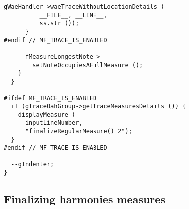 \begin{lstlisting}[language=CPlusPlus]
        gWaeHandler->waeTraceWithoutLocationDetails (
          __FILE__, __LINE__,
          ss.str ());
      }
#endif // MF_TRACE_IS_ENABLED

      fMeasureLongestNote->
        setNoteOccupiesAFullMeasure ();
    }
  }

#ifdef MF_TRACE_IS_ENABLED
  if (gTraceOahGroup->getTraceMeasuresDetails ()) {
    displayMeasure (
      inputLineNumber,
      "finalizeRegularMeasure() 2");
  }
#endif // MF_TRACE_IS_ENABLED

  --gIndenter;
}
\end{lstlisting}


\subsection{Finalizing harmonies measures}

